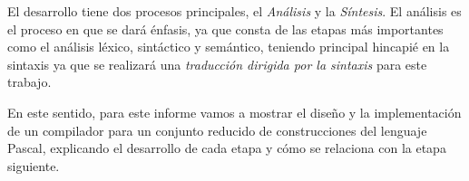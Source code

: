 \documentclass[a4paper]{report}
\begin{document}
El desarrollo tiene dos procesos principales, el \emph{Análisis} y la \emph{Síntesis}. El análisis es el proceso en que se dará énfasis, ya que consta de las etapas más importantes como el análisis léxico, sintáctico y semántico, teniendo principal hincapié en la sintaxis ya que se realizará una \emph{traducción dirigida por la sintaxis} para este trabajo.

En este sentido, para este informe vamos a mostrar el diseño y la implementación de un compilador para un conjunto reducido de construcciones del lenguaje Pascal, explicando el desarrollo de cada etapa y cómo se relaciona con la etapa siguiente.

\setcounter{page}{1}












\end{document}
